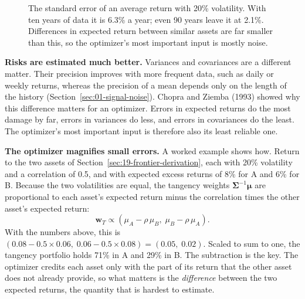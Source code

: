 \begin{figure}[htbp]
\centering
{}
\caption{The standard error of an average return with 20\% volatility. With ten years of data it is 6.3\% a year; even 90 years leave it at 2.1\%. Differences in expected return between similar assets are far smaller than this, so the optimizer's most important input is mostly noise.}
\label{fig:19-se}
\end{figure}

\textbf{Risks are estimated much better.} Variances and covariances are a different matter. Their precision improves with more frequent data, such as daily or weekly returns, whereas the precision of a mean depends only on the length of the history (Section~\ref{sec:01-signal-noise}). Chopra and Ziemba (1993) showed why this difference matters for an optimizer. Errors in expected returns do the most damage by far, errors in variances do less, and errors in covariances do the least. The optimizer's most important input is therefore also its least reliable one.

\textbf{The optimizer magnifies small errors.} A worked example shows how. Return to the two assets of Section~\ref{sec:19-frontier-derivation}, each with 20\% volatility and a correlation of 0.5, and with expected excess returns of 8\% for A and 6\% for B. Because the two volatilities are equal, the tangency weights $\boldsymbol{\Sigma}^{-1}\boldsymbol{\mu}$ are proportional to each asset's expected return minus the correlation times the other asset's expected return:
\begin{equation}
  \mathbf{w}_T \propto (\mu_A - \rho\,\mu_B,\; \mu_B - \rho\,\mu_A).
  \label{eq:19-two-weights}
\end{equation}
With the numbers above, this is $(0.08 - 0.5 \times 0.06,\; 0.06 - 0.5 \times 0.08) = (0.05,\; 0.02)$. Scaled to sum to one, the tangency portfolio holds 71\% in A and 29\% in B. The subtraction is the key. The optimizer credits each asset only with the part of its return that the other asset does not already provide, so what matters is the \emph{difference} between the two expected returns, the quantity that is hardest to estimate.

